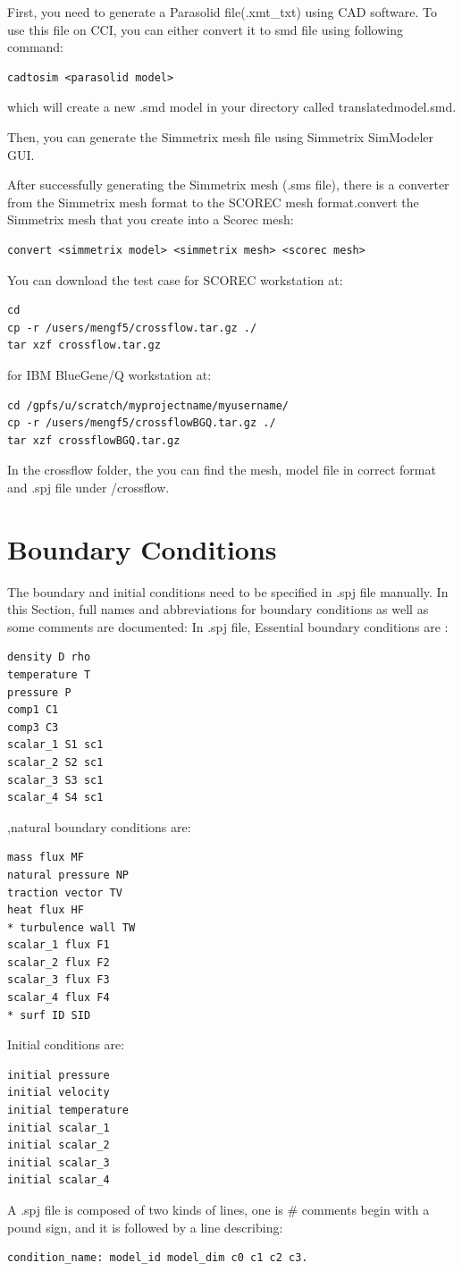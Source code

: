 \documentclass{article}
\begin{document}
First, you need to generate a Parasolid file(.xmt\_txt) using CAD software. To use this file on CCI, you can either convert it to smd file using following command:
\begin{lstlisting}
cadtosim <parasolid model> 
\end{lstlisting}
which will create a new .smd model in your directory called translatedmodel.smd.

Then, you can generate the Simmetrix mesh file using Simmetrix SimModeler GUI.

After successfully generating the Simmetrix mesh (.sms file), there is a converter from the Simmetrix mesh format to the SCOREC mesh format.convert the Simmetrix mesh that you create into a Scorec mesh:
\begin{lstlisting}
convert <simmetrix model> <simmetrix mesh> <scorec mesh>
\end{lstlisting}

You can download the test case for SCOREC workstation at:
\begin{lstlisting}
cd
cp -r /users/mengf5/crossflow.tar.gz ./
tar xzf crossflow.tar.gz
\end{lstlisting}
for IBM BlueGene/Q workstation at:
\begin{lstlisting}
cd /gpfs/u/scratch/myprojectname/myusername/
cp -r /users/mengf5/crossflowBGQ.tar.gz ./
tar xzf crossflowBGQ.tar.gz
\end{lstlisting}
In the crossflow folder, the you can find the mesh, model file in correct format and .spj file under /crossflow.

\section{Boundary Conditions}
\label{ch:4}
The boundary and initial conditions need to be specified in .spj file manually. In this Section, full names and abbreviations for boundary conditions as well as some comments are documented:
In .spj file, Essential boundary conditions are :
\begin{lstlisting}
density D rho
temperature T
pressure P
comp1 C1
comp3 C3
scalar_1 S1 sc1
scalar_2 S2 sc1
scalar_3 S3 sc1
scalar_4 S4 sc1
\end{lstlisting}
,natural boundary conditions are:
\begin{lstlisting}
mass flux MF
natural pressure NP
traction vector TV
heat flux HF
* turbulence wall TW
scalar_1 flux F1
scalar_2 flux F2
scalar_3 flux F3
scalar_4 flux F4
* surf ID SID
\end{lstlisting}
Initial conditions are:
\begin{lstlisting}
initial pressure
initial velocity
initial temperature
initial scalar_1
initial scalar_2
initial scalar_3
initial scalar_4
\end{lstlisting}
A .spj file is composed of two kinds of lines, one is $\#$ comments begin with a pound sign, and it is followed by a line describing: 
\begin{lstlisting}
condition_name: model_id model_dim c0 c1 c2 c3. 
\end{lstlisting}
\end{document}
